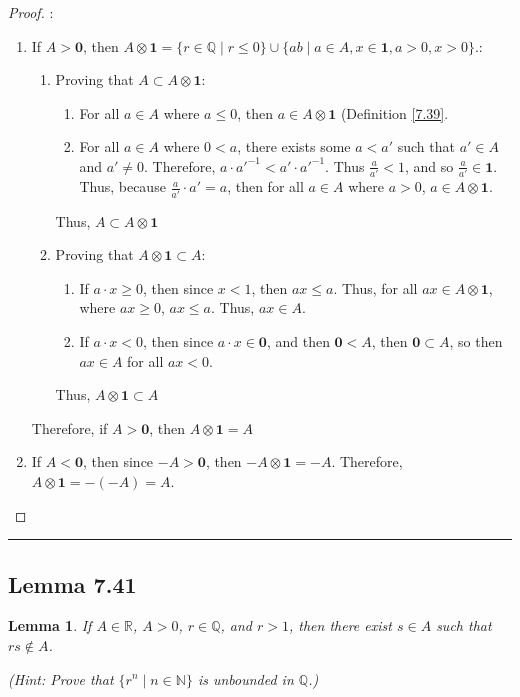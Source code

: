 \documentclass[openany, amssymb, psamsfonts]{amsart}
\newcommand{\bbN}{\mathbb{N}}
\newcommand{\bbQ}{\mathbb{Q}}
\newcommand{\bbR}{\mathbb{R}}
\newtheorem{lem}{Lemma}[section]
\theoremstyle{definition}
\numberwithin{equation}{section}
\begin{document}
\begin{proof}:\\
\begin{enumerate}
    \item If $A>\textbf{0}$, then $A\otimes \textbf{1} = \{r \in \bbQ \mid r \leq 0\} \cup \{ab \mid a\in A, x\in \textbf{1}, a > 0, x > 0\}.$:
    \begin{enumerate}
        \item Proving that $A\subset A \otimes \textbf{1}$:
        \begin{enumerate}
            \item For all $a\in A$ where $a\leq 0$, then $a\in A\otimes \textbf{1}$ (Definition \ref{7.39}.
            \item For all $a\in A$ where $0<a$, there exists some $a<a'$ such that $a'\in A$ and $a'\neq 0$. Therefore, $a\cdot a'^{-1}<a'\cdot a'^{-1}$. Thus $\frac{a}{a'}<1$, and so $\frac{a}{a'}\in \textbf{1}$. Thus, because $\frac{a}{a'}\cdot a' = a$, then for all $a\in A$ where $a>0$, $a\in A\otimes \textbf{1}$.
        \end{enumerate}
        Thus, $A\subset A \otimes \textbf{1}$
        \item Proving that $ A \otimes \textbf{1}\subset A$:
        \begin{enumerate}
            \item If $a\cdot x \geq 0$, then since $x<1$, then $ax\leq a$. Thus, for all $ax\in A\otimes \textbf{1}$, where $ax\geq 0$, $ax\leq a$. Thus, $ax\in A$.
            \item If $a\cdot x< 0$, then since $a\cdot x \in \textbf{0}$, and then $\textbf{0}<A$, then $\textbf{0}\subset A$, so then $ax\in A$ for all $ax<0$.
        \end{enumerate}
        Thus, $A\otimes \textbf{1} \subset A$
\end{enumerate}
Therefore, if $A>\textbf{0}$, then $A\otimes \textbf{1} = A$
\item If $A<\textbf{0}$, then since $-A>\textbf{0}$, then $-A \otimes \textbf{1} = -A$. Therefore, $A \otimes \textbf{1} = -(-A) = A$.
\end{enumerate}

\end{proof}
\vspace{4pt}     \hrule   \vspace{4pt}

\subsection*{Lemma 7.41}
\begin{lem}
\label{7.41}
	If $A \in \bbR$, $A > 0$, $r \in \bbQ$, and $r > 1$, then there exist $s\in A$ such that $rs\not\in A$.
	

	(Hint: Prove that $\{r^n \mid n \in \bbN\}$ is unbounded in $\bbQ$.)
\end{lem}
\end{document}
